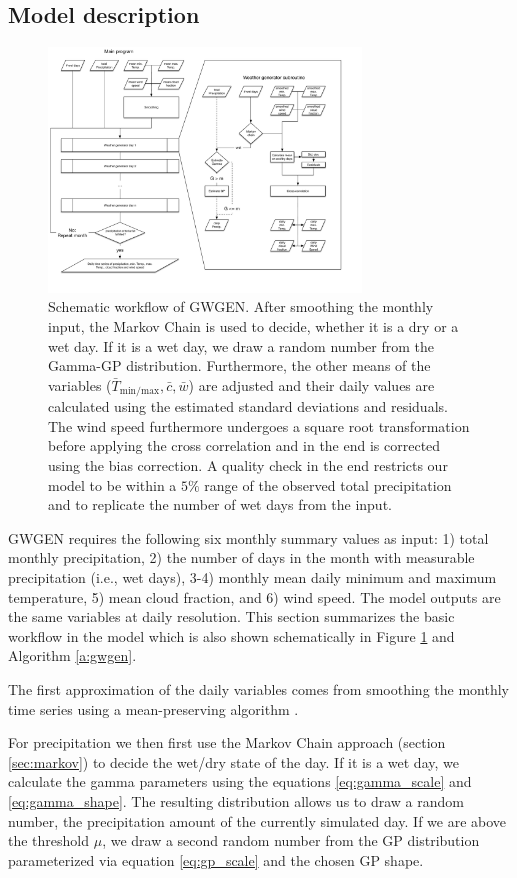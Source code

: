 \begin{refsection}
\section{Model description} \label{sec:model}
\begin{figure}
	\includegraphics[width=8.3cm]{Figures/f01.pdf}
	\caption[Schematic workflow of GWGEN]{Schematic workflow of GWGEN. After smoothing the monthly input, the Markov Chain is used to decide, whether it is a dry or a wet day. If it is a wet day, we draw a random number from the Gamma-GP distribution. Furthermore, the other means of the variables ($\bar{T}_\mathrm{min/max}, \bar{c}, \bar{w}$) are adjusted and their daily values are calculated using the estimated standard deviations and residuals. The wind speed furthermore undergoes a square root transformation before applying the cross correlation and in the end is corrected using the bias correction. A quality check in the end restricts our model to be within a $5\%$ range of the observed total precipitation and to replicate the number of wet days from the input.}
	\label{fig:schema}
\end{figure}
GWGEN requires the following six monthly summary values as input: 1) total monthly precipitation, 2) the number of days in the month with measurable precipitation (i.e., wet days), 3-4) monthly mean daily minimum and maximum temperature, 5) mean cloud fraction, and 6) wind speed. The model outputs are the same variables at daily resolution. This section summarizes the basic workflow in the model which is also shown schematically in Figure \ref{fig:schema} and Algorithm \autoref{a:gwgen}.

The first approximation of the daily variables comes from smoothing the monthly time series using a mean-preserving algorithm \citep{RymesMyers2001}.

For precipitation we then first use the Markov Chain approach (section \ref{sec:markov}) to decide the wet/dry state of the day. If it is a wet day, we calculate the gamma parameters using the equations \eqref{eq:gamma_scale} and \eqref{eq:gamma_shape}. The resulting distribution allows us to draw a random number, the precipitation amount of the currently simulated day. If we are above the threshold $\mu$, we draw a second random number from the GP distribution parameterized via equation \eqref{eq:gp_scale} and the chosen GP shape.


\end{refsection}
